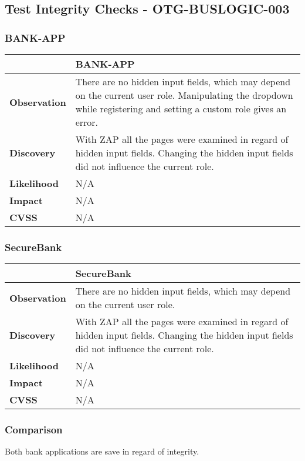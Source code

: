 \subsection{Test Integrity Checks - OTG-BUSLOGIC-003}
\subsubsection{BANK-APP}
\begin{tabular*}{\textwidth}{ p{} | p{} }\hline
    & \textbf{BANK-APP} \\ \hline
    \textbf{Observation} & There are no hidden input fields, which may depend on the current user role. Manipulating the dropdown while registering and setting a custom role gives an error. \\
    \textbf{Discovery} & With ZAP all the pages were examined in regard of hidden input fields. Changing the hidden input fields did not influence the current role. \\
    \textbf{Likelihood} & N/A \\
    \textbf{Impact} & N/A \\
    \textbf{CVSS} & N/A \\ \hline
\end{tabular*}

\subsubsection{SecureBank}
\begin{tabular*}{\textwidth}{ p{} | p{} }\hline
    & \textbf{SecureBank} \\ \hline
    \textbf{Observation} & There are no hidden input fields, which may depend on the current user role. \\
    \textbf{Discovery} & With ZAP all the pages were examined in regard of hidden input fields. Changing the hidden input fields did not influence the current role. \\
    \textbf{Likelihood} & N/A \\
    \textbf{Impact} & N/A \\
    \textbf{CVSS} & N/A \\ \hline
\end{tabular*}

\subsubsection{Comparison}
Both bank applications are save in regard of integrity.
\clearpage